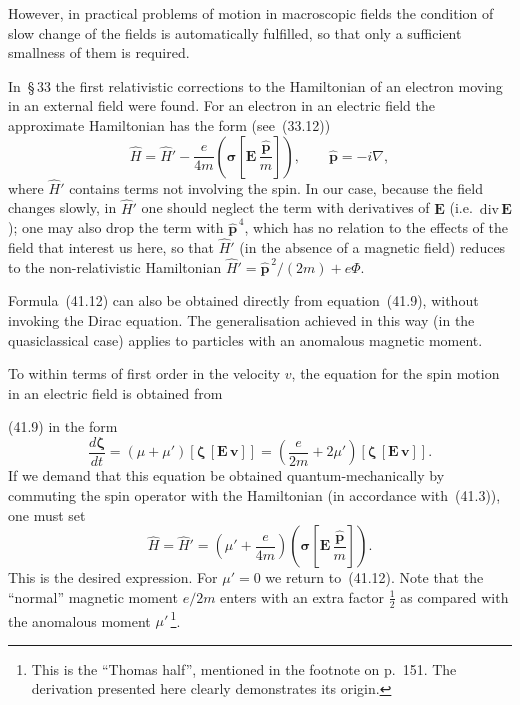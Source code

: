 However, in practical problems of motion in macroscopic fields the condition of slow change of the fields is automatically fulfilled, so that only a sufficient smallness of them is required.

In~\S\,33 the first relativistic corrections to the Hamiltonian of an electron moving in an external field were found. For an electron in an electric field the approximate Hamiltonian has the form (see~(33.12))
\begin{equation}
\widehat H = \widehat H' - \frac{e}{4m}\!\left(\boldsymbol{\sigma}\!\left[\mathbf{E}\,\frac{\widehat{\mathbf{p}}}{m}\right]\right),\qquad \widehat{\mathbf{p}} = -i\nabla,
\tag{41.12}
\end{equation}
where $\widehat H'$ contains terms not involving the spin. In our case, because the field changes slowly, in $\widehat H'$ one should neglect the term with derivatives of $\mathbf{E}$ (i.e.\ $\mathrm{div}\,\mathbf{E}$); one may also drop the term with $\widehat{\mathbf{p}}^{\,4}$, which has no relation to the effects of the field that interest us here, so that $\widehat H'$ (in the absence of a magnetic field) reduces to the non-relativistic Hamiltonian $\widehat H' = \widehat{\mathbf{p}}^{\,2}/(2m) + e\Phi$.

Formula~(41.12) can also be obtained directly from equation~(41.9), without invoking the Dirac equation. The generalisation achieved in this way (in the quasiclassical case) applies to particles with an anomalous magnetic moment.

To within terms of first order in the velocity $v$, the equation for the spin motion in an electric field is obtained from

(41.9) in the form
\[
\frac{d\boldsymbol{\zeta}}{dt} = (\mu + \mu')[\boldsymbol{\zeta}\,[\mathbf{E}\,\mathbf{v}]] = \left(\frac{e}{2m} + 2\mu'\right)[\boldsymbol{\zeta}\,[\mathbf{E}\,\mathbf{v}]].
\]
If we demand that this equation be obtained quantum-mechanically by commuting the spin operator with the Hamiltonian (in accordance with~(41.3)), one must set
\[
\widehat H = \widehat H' = \left(\mu' + \frac{e}{4m}\right)\!\left(\boldsymbol{\sigma}\!\left[\mathbf{E}\,\frac{\widehat{\mathbf{p}}}{m}\right]\right).
\tag{41.13}
\]
This is the desired expression. For $\mu' = 0$ we return to~(41.12). Note that the ``normal'' magnetic moment $e/2m$ enters with an extra factor $\tfrac{1}{2}$ as compared with the anomalous moment $\mu'$\,\footnote{This is the ``Thomas half'', mentioned in the footnote on p.~151. The derivation presented here clearly demonstrates its origin.}.

